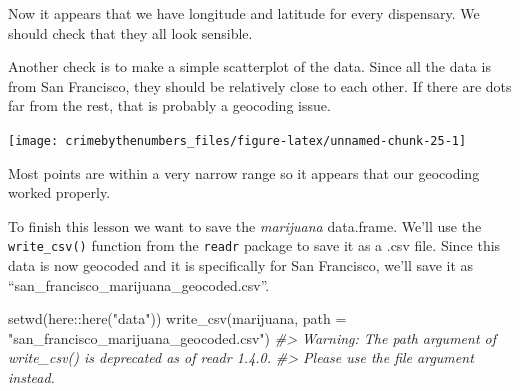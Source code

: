 \documentclass[
  12pt,
  openany]{book}
\newenvironment{Shaded}{\begin{snugshade}}{\end{snugshade}}
\newcommand{\AttributeTok}[1]{\textcolor[rgb]{0.61,0.61,0.61}{#1}}
\newcommand{\CommentTok}[1]{\textcolor[rgb]{0.37,0.37,0.37}{\textit{#1}}}
\newcommand{\FunctionTok}[1]{\textcolor[rgb]{0,0,0}{#1}}
\newcommand{\NormalTok}[1]{#1}
\newcommand{\SpecialCharTok}[1]{\textcolor[rgb]{0,0,0}{#1}}
\newcommand{\StringTok}[1]{\textcolor[rgb]{0.5,0.5,0.5}{#1}}
\begin{document}
Now it appears that we have longitude and latitude for every dispensary. We should check that they all look sensible.

\begin{Shaded}
\end{Shaded}

\begin{Shaded}
\end{Shaded}

Another check is to make a simple scatterplot of the data. Since all the data is from San Francisco, they should be relatively close to each other. If there are dots far from the rest, that is probably a geocoding issue.

\begin{Shaded}
\end{Shaded}

\begin{center}\texttt{[image: crimebythenumbers\_files/figure-latex/unnamed-chunk-25-1]} \end{center}

Most points are within a very narrow range so it appears that our geocoding worked properly.

To finish this lesson we want to save the \emph{marijuana} data.frame. We'll use the \texttt{write\_csv()} function from the \texttt{readr} package to save it as a .csv file. Since this data is now geocoded and it is specifically for San Francisco, we'll save it as ``san\_francisco\_marijuana\_geocoded.csv''.

\begin{Shaded}
\begin{Highlighting}[]
\FunctionTok{setwd}\NormalTok{(here}\SpecialCharTok{::}\FunctionTok{here}\NormalTok{(}\StringTok{"data"}\NormalTok{))}
\FunctionTok{write\_csv}\NormalTok{(marijuana, }\AttributeTok{path =} \StringTok{"san\_francisco\_marijuana\_geocoded.csv"}\NormalTok{)}
\CommentTok{\#\textgreater{} Warning: The \textasciigrave{}path\textasciigrave{} argument of \textasciigrave{}write\_csv()\textasciigrave{} is deprecated as of readr 1.4.0.}
\CommentTok{\#\textgreater{} Please use the \textasciigrave{}file\textasciigrave{} argument instead.}
\end{Highlighting}
\end{Shaded}
\end{document}
